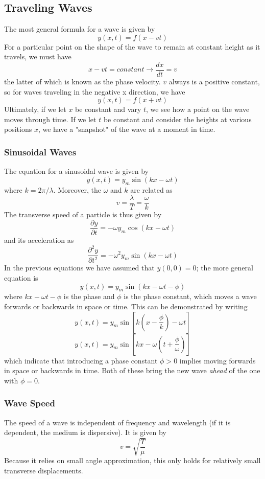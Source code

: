 \documentclass[../PhysicsFormulae.tex]{subfiles}
\begin{document}
\subsection{Traveling Waves}
The most general formula for a wave is given by 
\[ y(x,t) = f(x-vt) \]
For a particular point on the shape of the wave to remain at constant height as it travels, we must have 
\[ x - vt = constant \rightarrow \frac{dx}{dt} = v\]
the latter of which is known as the phase velocity. $v$ always is a positive constant, so for waves traveling in the negative x direction, we have 
\[ y(x,t) = f(x+vt) \]
Ultimately, if we let $x$ be constant and vary $t$, we see how a point on the wave moves through time. If we let $t$ be constant and consider the heights at various positions $x$, we have a "snapshot" of the wave at a moment in time. 

\subsubsection{Sinusoidal Waves}
The equation for a sinusoidal wave is given by 
\[ y(x,t) = y_m\sin(kx - \omega t) \]
where $k = 2\pi / \lambda $. Moreover, the $\omega$ and $k$ are related as
\[ v = \frac{\lambda}{T} = \frac{\omega}{k} \]
The transverse speed of a particle is thus given by 
\[ \frac{\partial y}{\partial t} = - \omega y_m \cos(kx - \omega t) \]
and its acceleration as 
\[ \frac{\partial^2 y}{\partial t^2} = - \omega^2 y_m \sin(kx - \omega t) \]
In the previous equations we have assumed that $y(0,0) = 0$; the more general equation is 
\[ y(x,t) = y_m \sin(kx - \omega t - \phi) \]
where $kx - \omega t - \phi$ is the phase and $\phi$ is the phase constant, which moves a wave forwards or backwards in space or time. This can be demonstrated by writing 
\[ y(x,t) = y_m \sin\left[k\left(x-\frac{\phi}{k}\right) - \omega t\right] \]
\[ y(x,t) = y_m \sin\left[kx - \omega \left(t + \frac{\phi}{\omega}\right) \right] \]
which indicate that introducing a phase constant $\phi>0$ implies moving forwards in space or backwards in time. Both of these bring the new wave \textit{ahead} of the one with $\phi = 0$. 

\subsubsection{Wave Speed}
The speed of a wave is independent of frequency and wavelength (if it is dependent, the medium is dispersive). It is given by
\[ v = \sqrt{\frac{T}{\mu}} \]
Because it relies on small angle approximation, this only holds for relatively small transverse displacements. \bigskip
\end{document}
